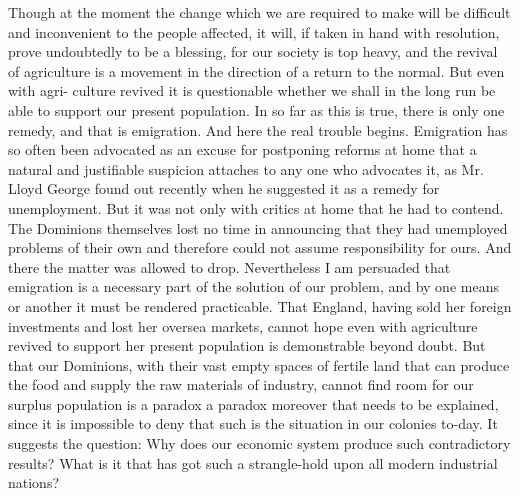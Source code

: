 \documentclass{book}
\begin{document}
Though at the moment the change which we are required to make will be difficult and inconvenient to the people affected, it will, if taken in hand with resolution, prove undoubtedly to be a blessing, for our society is top heavy, and the revival of agriculture is a movement in the direction of a return to the normal. But even with agri- culture revived it is questionable whether we shall in the long run be able to support our present population. In so far as this is true, there is only one remedy, and that is emigration. And here the real trouble begins. Emigration has so often been advocated as an excuse for postponing reforms at home that a natural and justifiable suspicion attaches to any one who advocates it, as Mr. Lloyd George found out recently when he suggested it as a remedy for unemployment. But it was not only with critics at home that he had to contend. The Dominions themselves lost no time in announcing that they had unemployed problems of their own and therefore could not assume responsibility for ours. And there the matter was allowed to drop. Nevertheless I am persuaded that emigration is a necessary part of the solution of our problem, and by one means or another it must be rendered practicable. That England, having sold her foreign investments and lost her oversea markets, cannot hope even with agriculture revived to support her present population is demonstrable beyond doubt. But that our Dominions, with their vast empty spaces of fertile land that can produce the food and supply the raw materials of industry, cannot find room for our surplus population is a paradox a paradox moreover that needs to be explained, since it is impossible to deny that such is the situation in our colonies to-day. It suggests the question: Why does our economic system produce such contradictory results? What is it that has got such a strangle-hold upon all modern industrial nations?
\end{document}
